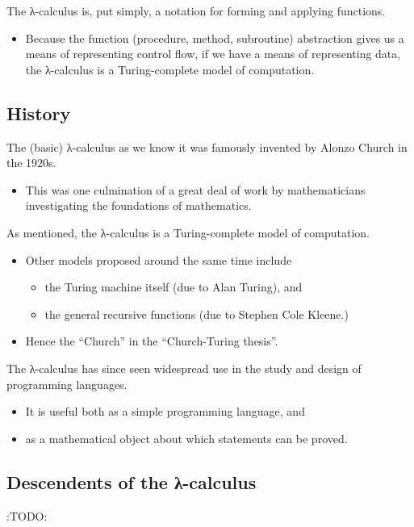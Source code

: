 \documentclass[11pt]{article}
\theoremstyle{definition}
\begin{document}
The λ-calculus is, put simply,
a notation for forming and applying functions.
\begin{itemize}
\item Because the function (procedure, method, subroutine) abstraction
gives us a means of representing control flow,
if we have a means of representing data,
the λ-calculus is a Turing-complete model of computation.
\end{itemize}

\subsection{History}
\label{sec:org9f070d1}

The (basic) λ-calculus as we know it was famously invented
by Alonzo Church in the 1920s.
\begin{itemize}
\item This was one culmination of a great deal of work by
mathematicians investigating the foundations of mathematics.
\end{itemize}

As mentioned, the λ-calculus is a Turing-complete model of computation.
\begin{itemize}
\item Other models proposed around the same time include
\begin{itemize}
\item the Turing machine itself (due to Alan Turing), and
\item the general recursive functions (due to Stephen Cole Kleene.)
\end{itemize}
\item Hence the “Church” in the “Church-Turing thesis”.
\end{itemize}

The λ-calculus has since seen widespread use in the study and design
of programming languages.
\begin{itemize}
\item It is useful both as a simple programming language, and
\item as a mathematical object about which statements can be proved.
\end{itemize}

\subsection{Descendents of the λ-calculus}
\label{sec:orge0fccfd}

:TODO:
\end{document}
